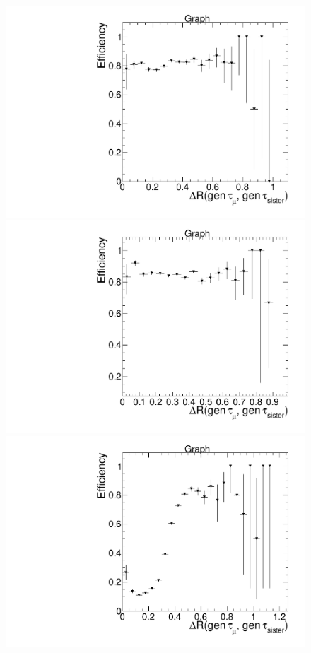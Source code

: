 \begin{figure}[hbtp]
  \begin{center}
    \includegraphics[width=0.8\cmsFigWidth]{figures/dRIsoEfficiency_muEOnly}
    \includegraphics[width=0.8\cmsFigWidth]{figures/dRIsoEfficiency_muMuOnly}
    \includegraphics[width=0.8\cmsFigWidth]{figures/dRIsoEfficiency_muHadOnly}

\end{center}
\end{figure}
